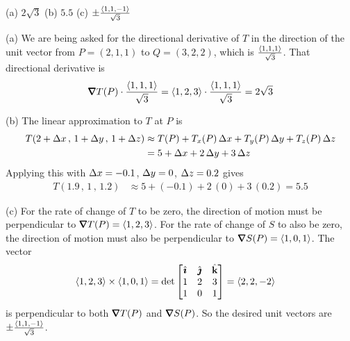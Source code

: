 %

\begin{answer}
(a) $2\sqrt{3}$ \qquad
(b) $5.5$\qquad
(c) $\pm\frac{\left< 1,1,-1\right>}{\sqrt{3}}$
\end{answer}

\begin{solution}
(a) We are being asked for the directional derivative of
$T$ in the direction of the  unit vector from $P=(2,1,1)$ to $Q=(3,2,2)$, 
which is $\frac{\left< 1,1,1\right>}{\sqrt{3}}$. That directional
derivative is
\begin{align*}
\vnabla T(P)\cdot \frac{\llt 1,1,1\rgt}{\sqrt{3}}
=\llt 1,2,3\rgt \cdot \frac{\llt 1,1,1\rgt}{\sqrt{3}}
=2\sqrt{3}
\end{align*}

(b) The linear approximation to $T$ at $P$ is
\begin{align*}
T(2+\Delta x\,,\,1+\Delta y\,,\,1+\Delta z)
   &\approx T(P) + T_x(P)\,\Delta x + T_y(P)\,\Delta y + T_z(P)\,\Delta z \\
   &= 5 +\Delta x +2\,\Delta y +3\,\Delta z 
\end{align*}
Applying this with $\Delta x = -0.1$, $\Delta y = 0$, $\Delta z=0.2$ gives
\begin{align*}
T(1.9\,,\,1\,,\,1.2)
   &\approx 5 +(-0.1) +2\,(0) +3\,(0.2) 
   =5.5
\end{align*}

(c) For the rate of change of $T$ to be zero, the direction of
motion must be perpendicular to $\vnabla T(P) = \llt 1,2,3\rgt$.
For the rate of change of $S$ to also be zero, the direction of
motion must also be perpendicular to $\vnabla S(P) = \llt 1,0,1\rgt$.
The vector 
\begin{align*}
\left< 1,2,3\right> \times \left< 1,0,1\right>
&=\det\left[\begin{matrix}
             \hat{\pmb{\imath}} & \hat{\pmb{\jmath}} & \hat{\mathbf{k}}\\ 
              1  &  2  & 3 \\
              1  &  0  & 1\end{matrix}\right]
=\left< 2,2,-2\right>
\end{align*}
is perpendicular to both $\vnabla T(P)$ and $\vnabla S(P)$.
So the desired unit vectors are $\pm\frac{\left< 1,1,-1\right>}{\sqrt{3}}$.
\end{solution}

